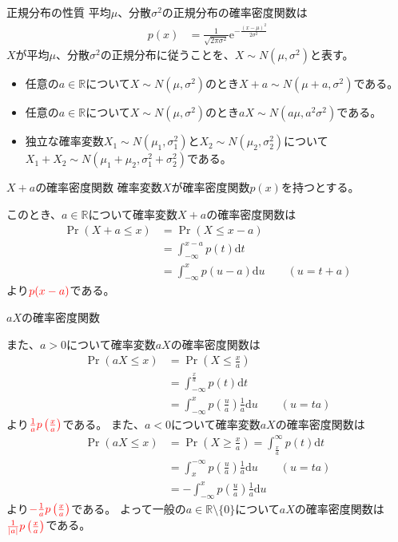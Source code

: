\documentclass[lualatex,handout]{beamer}
\newcommand{\mycolor}[2]{%
  \begingroup
  \colorlet{currentcolor}{.}%
  \color{#1}#2%
  \color{currentcolor}%
  \endgroup
}
\newcommand{\emm}[1]{\mycolor{red}{#1}}
\theoremstyle{definition}
\begin{document}
\begin{frame}{正規分布の性質}
平均$\mu$、分散$\sigma^2$の正規分布の確率密度関数は
\begin{align*}
p(x) &= \frac1{\sqrt{2\pi\sigma^2}} \mathrm{e}^{-\frac{(x-\mu)^2}{2\sigma^2}}
\end{align*}
$X$が平均$\mu$、分散$\sigma^2$の正規分布に従うことを、$X\sim N(\mu,\sigma^2)$と表す。

\begin{itemize}
\setlength{\itemsep}{2em}
\item 任意の$a\in\mathbb{R}$について$X\sim N(\mu,\sigma^2)$のとき$X+a\sim N(\mu+a,\sigma^2)$である。
\item 任意の$a\in\mathbb{R}$について$X\sim N(\mu,\sigma^2)$のとき$aX\sim N(a\mu,a^2\sigma^2)$である。
\item 独立な確率変数$X_1\sim N(\mu_1, \sigma_1^2)$と$X_2\sim N(\mu_2, \sigma_2^2)$について
$X_1+X_2\sim N(\mu_1+\mu_2, \sigma_1^2+\sigma_2^2)$である。
\end{itemize}
\end{frame}

\begin{frame}{$X+a$の確率密度関数}
\small
確率変数$X$が確率密度関数$p(x)$を持つとする。

このとき、$a\in\mathbb{R}$について確率変数$X+a$の確率密度関数は
\begin{align*}
\Pr(X+a \le x)&= \Pr(X\le x-a)\\
&=\int_{-\infty}^{x-a} p(t) \mathrm{d}t\\
&=\int_{-\infty}^{x} p(u-a) \mathrm{d}u\qquad(u = t+a)
\end{align*}
より$\emm{p(x-a)}$である。
\end{frame}

\begin{frame}{$aX$の確率密度関数}
\scriptsize

また、$a>0$について確率変数$aX$の確率密度関数は
\begin{align*}
\Pr(aX \le x)&= \Pr\left(X\le \frac{x}{a}\right)\\
&=\int_{-\infty}^{\frac{x}{a}} p(t) \mathrm{d}t\\
&=\int_{-\infty}^{x} p\left(\frac{u}{a}\right) \frac1a\mathrm{d}u\qquad(u = ta)
\end{align*}
より$\emm{\frac1a p\left(\frac{x}{a}\right)}$である。
%
また、$a<0$について確率変数$aX$の確率密度関数は
\begin{align*}
\Pr(aX \le x)&= \Pr\left(X\ge \frac{x}{a}\right)
=\int_{\frac{x}{a}}^\infty p(t) \mathrm{d}t\\
&=\int_{x}^{-\infty} p\left(\frac{u}{a}\right) \frac1a\mathrm{d}u\qquad(u = ta)\\
&=-\int_{-\infty}^x p\left(\frac{u}{a}\right) \frac1a\mathrm{d}u
\end{align*}
より$\emm{-\frac1a p\left(\frac{x}{a}\right)}$である。
よって一般の$a\in\mathbb{R}\setminus\{0\}$について$aX$の確率密度関数は$\emm{\frac1{|a|}p\left(\frac{x}{a}\right)}$である。
\end{frame}
\end{document}
